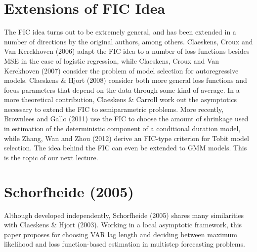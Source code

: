 \section{Extensions of FIC Idea}
The FIC idea turns out to be extremely general, and has been extended in a number of directions by the original authors, among others. 
Claeskens, Croux and Van Kerckhoven (2006) adapt the FIC idea to a number of loss functions besides MSE in the case of logistic regression, while Claeskens, Croux and Van Kerckhoven (2007) consider the problem of model selection for autoregressive models. 
Claeskens \& Hjort (2008) consider both more general loss functions and focus parameters that depend on the data through some kind of average. In a more theoretical contribution, Claeskens \& Carroll work out the asymptotics necessary to extend the FIC to semiparametric problems.
 More recently, Brownlees and Gallo (2011) use the FIC to choose the amount of shrinkage used in estimation of the deterministic component of a conditional duration model, while Zhang, Wan and Zhou (2012) derive an FIC-type criterion for Tobit model selection. 
 The idea behind the FIC can even be extended to GMM models. This is the topic of our next lecture.

\section{Schorfheide (2005)}
Although developed independently, Schorfheide (2005) shares many similarities with Claeskens \& Hjort (2003). 
Working in a local asymptotic framework, this paper proposes for choosing VAR lag length and deciding between maximum likelihood and loss function-based estimation in multistep forecasting problems.



